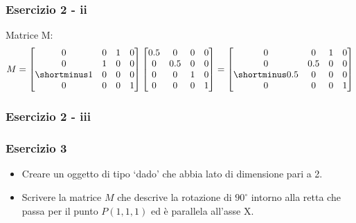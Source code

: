 \documentclass{beamer}
\newcommand{\fig}{figures} %
\begin{document}
\begin{frame}
\frametitle{Esercizio 2 - ii}
Matrice M:
\begin{displaymath}
M = 
\begin{bmatrix}
        0 & 0 & 1 & 0\\
        0 & 1 & 0 & 0 \\
        \shortminus 1 & 0 & 0 & 0 \\
        0 & 0 & 0 & 1 
\end{bmatrix}
\begin{bmatrix}
    0.5 & 0   & 0   & 0 \\
      0 & 0.5 & 0   & 0 \\
      0 & 0   & 1   & 0 \\
      0 & 0   & 0   & 1 
\end{bmatrix}
 = 
\begin{bmatrix}
        0 & 0 & 1 & 0\\
        0 & 0.5 & 0 & 0 \\
        \shortminus 0.5 & 0 & 0 & 0 \\
        0 & 0 & 0 & 1 
\end{bmatrix}
\end{displaymath}
\end{frame}

\begin{frame}
\frametitle{Esercizio 2 - iii}
\begin{center}
\end{center}
\end{frame}

\begin{frame}
\frametitle{Esercizio 3}
\begin{itemize}
    \item Creare un oggetto di tipo `dado' che abbia lato di dimensione pari a 2.
    \item Scrivere la matrice $M$ che descrive la rotazione di $90^\circ$ intorno alla retta 
        che passa per il punto $P(1, 1, 1)$ ed \`e parallela all'asse X.
\end{itemize}
\end{frame}
\end{document}
